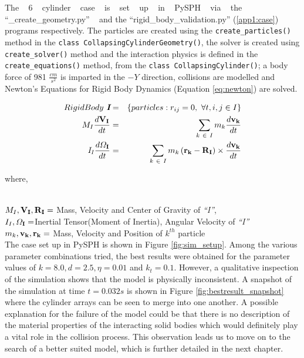 The ~ 6 ~ cylinder ~ case ~ is ~ set ~ up ~ in ~ PySPH ~ via ~ the ~ ``\_create\_geometry.py'' ~ and the ``rigid\_body\_validation.py'' (\ref{app1:case}) programs respectively. The particles are created using the \lstinline!create_particles()! method in the \lstinline!class CollapsingCylinderGeometry()!, the solver is created using \lstinline!create_solver()! method and the interaction physics is defined in the \lstinline!create_equations()! method, from the \lstinline!class CollapsingCylinder()!; a body force of 981 $\frac{cm}{s^2}$ is imparted in the $-Y$ direction, collisions are modelled and Newton's Equations for Rigid Body Dynamics (Equation \ref{eq:newton}) are solved.

\begin{eqnarray}\label{eq:newton}
Rigid Body ~{\textit{\textbf{I}}} &=& \left\lbrace particles : r_{ij} = 0, ~ \forall t , i,j \in I\right\rbrace \nonumber \\
M_{I}\frac{d{\it{{\bf{V_I}}}}}{dt} &=& \sum_{k~\in~I} m_{k} \frac{d{\it{{\bf{v_k}}}}}{dt} \\
{\bf{\it{I_I}}} \frac{d{\bf{\varOmega _{I}}}}{dt} &=& \sum_{k~\in~I} m_{k}\left( {\bf{r_k - R_I}}\right) \times \frac{d{\it{{\bf{v_k}}}}}{dt} \nonumber
\end{eqnarray}

{\raggedright{where,}} \\
$M_I , {\it{\bf{V_I}}}, {\it{\bf{R_I}}} = $ Mass, Velocity and Center of Gravity of {\it{``I''}}, \\
$I_I , {{\bf{\varOmega _{I}}}} = $Inertial Tensor(Moment of Inertia), Angular Velocity of {\it{``I''}} \\
$m_k , {\it{{\bf{v_k}}}}, \bf{r_k} =$ Mass, Velocity and Position of $k^{th}$ particle\\

The case set up in PySPH is shown in Figure \ref{fig:sim_setup}. Among the various parameter combinations tried, the best results were obtained for the parameter values of $k = 8.0, d = 2.5, \eta = 0.01$ and $k_t = 0.1$. However, a qualitative inspection of the simulation shows that the model is physically inconsistent. A snapshot of the simulation at time $t = 0.032s$ is shown in Figure \ref{fig:bestresult_snapshot} where the cylinder arrays can be seen to merge into one another. A possible explanation for the failure of the model could be that there is no description of the material properties of the interacting solid bodies which would definitely play a vital role in the collision process. This observation leads us to move on to the search of a better suited model, which is further detailed in the next chapter.

